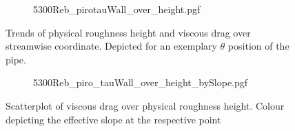 
\begin{figure}
    \centering
    \begin{subfigure}{0.75\textwidth}
        \centering
        {5300Reb_pirotauWall_over_height.pgf}
    \end{subfigure}
    \caption[Trends of physical roughness height and viscous drag over streamwise coordinate]{Trends of physical roughness height and viscous drag over streamwise coordinate. Depicted for an exemplary $\theta$ position of the pipe.}
    \label{fig: roughness height and viscous stress Reb 5300 piro}
\end{figure}
\begin{figure}
    \centering
    \begin{subfigure}{0.7\textwidth}
        \hspace{0.9cm}
        {5300Reb_piro_tauWall_over_height_bySlope.pgf}
    \end{subfigure}
    \caption[Scatterplot of viscous drag over physical roughness height]{Scatterplot of viscous drag over physical roughness height. Colour depicting the effective slope at the respective point}
    \label{fig: scatterplot piro Reb 5300}
\end{figure}


